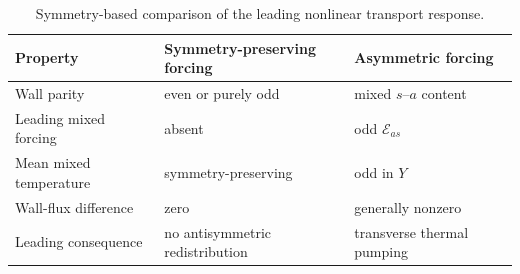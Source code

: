 \documentclass[12pt,a4paper]{article}
\newenvironment{ruledtabular}{}{}
\begin{document}
\begin{table}[htb]
  \centering
  \caption{Symmetry-based comparison of the leading nonlinear transport response.}
  \label{tab:paper_comparison}
  \begin{ruledtabular}
  \footnotesize
  \setlength{\tabcolsep}{5pt}
  \begin{tabular}{@{\hspace{4pt}}lll@{\hspace{4pt}}}
  Property & Symmetry-preserving forcing & Asymmetric forcing \\
  \hline
  Wall parity & even or purely odd & mixed $s$--$a$ content \\
  Leading mixed forcing & absent & odd $\mathcal E_{as}$ \\
  Mean mixed temperature & symmetry-preserving & odd in $Y$ \\
  Wall-flux difference & zero & generally nonzero \\
  Leading consequence & no antisymmetric redistribution & transverse thermal pumping \\
  \end{tabular}
  \end{ruledtabular}
\end{table}
\end{document}
